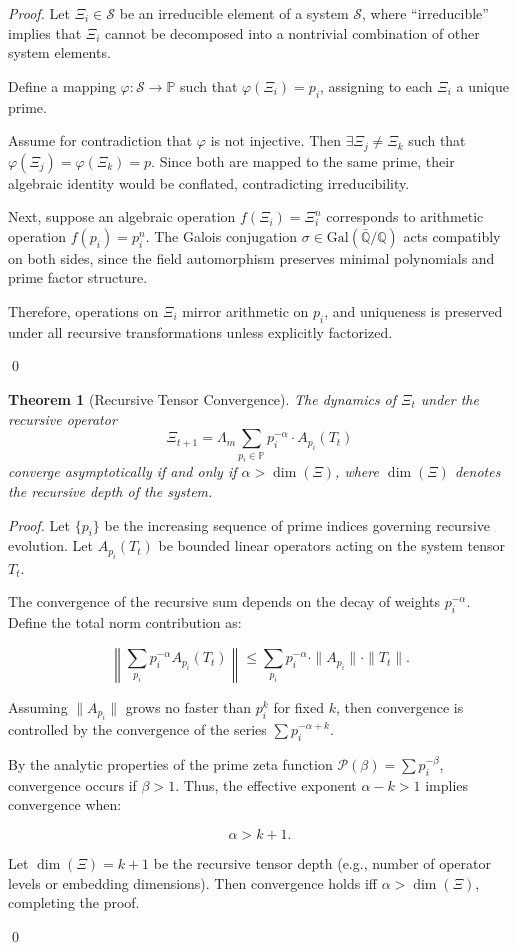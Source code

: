 \documentclass{article}
\theoremstyle{plain}
\newtheorem{theorem}{Theorem}
\begin{document}
\begin{proof}
Let \( \Xi_i \in \mathcal{S} \) be an irreducible element of a system \( \mathcal{S} \), where “irreducible” implies that \( \Xi_i \) cannot be decomposed into a nontrivial combination of other system elements.

Define a mapping \( \varphi: \mathcal{S} \rightarrow \mathbb{P} \) such that \( \varphi(\Xi_i) = p_i \), assigning to each \( \Xi_i \) a unique prime.

Assume for contradiction that \( \varphi \) is not injective. Then \( \exists \Xi_j \neq \Xi_k \) such that \( \varphi(\Xi_j) = \varphi(\Xi_k) = p \). Since both are mapped to the same prime, their algebraic identity would be conflated, contradicting irreducibility.

Next, suppose an algebraic operation \( f(\Xi_i) = \Xi_i^n \) corresponds to arithmetic operation \( f(p_i) = p_i^n \). The Galois conjugation \( \sigma \in \text{Gal}(\bar{\mathbb{Q}}/\mathbb{Q}) \) acts compatibly on both sides, since the field automorphism preserves minimal polynomials and prime factor structure.

Therefore, operations on \( \Xi_i \) mirror arithmetic on \( p_i \), and uniqueness is preserved under all recursive transformations unless explicitly factorized.

\qed
\end{proof}

\begin{theorem}[Recursive Tensor Convergence]
The dynamics of \( \Xi_t \) under the recursive operator 
\[
\Xi_{t+1} = \Lambda_m \sum_{p_i \in \mathbb{P}} p_i^{-\alpha} \cdot A_{p_i}(T_t)
\]
converge asymptotically if and only if \( \alpha > \dim(\Xi) \), where \( \dim(\Xi) \) denotes the recursive depth of the system.
\end{theorem}

\begin{proof}
Let \( \{p_i\} \) be the increasing sequence of prime indices governing recursive evolution. Let \( A_{p_i}(T_t) \) be bounded linear operators acting on the system tensor \( T_t \).

The convergence of the recursive sum depends on the decay of weights \( p_i^{-\alpha} \). Define the total norm contribution as:

\[
\left\| \sum_{p_i} p_i^{-\alpha} A_{p_i}(T_t) \right\| \leq \sum_{p_i} p_i^{-\alpha} \cdot \|A_{p_i}\| \cdot \|T_t\|.
\]

Assuming \( \|A_{p_i}\| \) grows no faster than \( p_i^k \) for fixed \( k \), then convergence is controlled by the convergence of the series \( \sum p_i^{-\alpha + k} \).

By the analytic properties of the prime zeta function \( \mathcal{P}(\beta) = \sum p_i^{-\beta} \), convergence occurs if \( \beta > 1 \). Thus, the effective exponent \( \alpha - k > 1 \) implies convergence when:

\[
\alpha > k + 1.
\]

Let \( \dim(\Xi) = k + 1 \) be the recursive tensor depth (e.g., number of operator levels or embedding dimensions). Then convergence holds iff \( \alpha > \dim(\Xi) \), completing the proof.

\qed
\end{proof}
\end{document}
